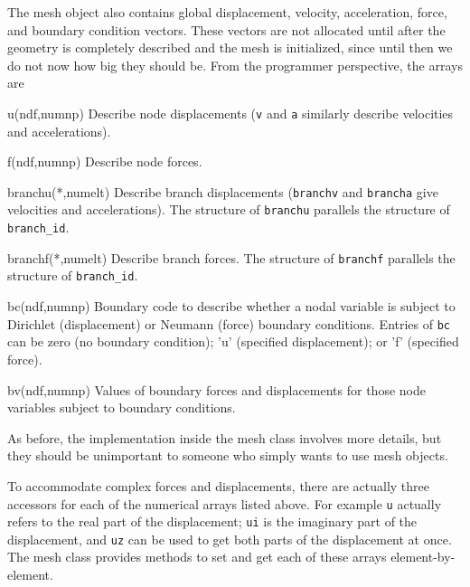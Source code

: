 \documentclass{article}
\newenvironment{codelist}[1][\quad]%
  {\begin{list}{}{%
   \settowidth{\labelwidth}{\texttt{#1}\hfil}%
   \setlength{\leftmargin}{\labelwidth}%
   \addtolength{\leftmargin}{\labelsep}%
   \addtolength{\leftmargin}{\parindent}%
   \renewcommand{\makelabel}[1]{\texttt{##1}}}}%
  {\end{list}}
\newcommand{\ttt}[1]{\texttt{#1}}
\begin{document}
The mesh object also contains global displacement, velocity,
acceleration, force, and boundary condition vectors.  These vectors
are not allocated until after the geometry is completely described and
the mesh is initialized, since until then we do not now how big they
should be.  From the programmer perspective, the arrays are
\begin{codelist}

  \item[u(ndf,numnp)]
    Describe node displacements (\ttt{v} and \ttt{a} similarly
    describe velocities and accelerations).

  \item[f(ndf,numnp)]    
    Describe node forces.

  \item[branchu(*,numelt)]
    Describe branch displacements (\ttt{branchv} and
    \ttt{brancha} give velocities and accelerations).  The
    structure of \ttt{branchu} parallels the structure of
    \ttt{branch\_id}.

  \item[branchf(*,numelt)]
    Describe branch forces.  The structure of \ttt{branchf}
    parallels the structure of \ttt{branch\_id}.

  \item[bc(ndf,numnp)]
    Boundary code to describe whether a nodal variable is subject to
    Dirichlet (displacement) or Neumann (force) boundary conditions.
    Entries of \ttt{bc} can be zero (no boundary condition); 'u'
    (specified displacement); or 'f' (specified force).

  \item[bv(ndf,numnp)]
    Values of boundary forces and displacements for those node variables
    subject to boundary conditions.

\end{codelist}
As before, the implementation inside the mesh class involves more
details, but they should be unimportant to someone who simply wants to
use mesh objects.

To accommodate complex forces and displacements, there are actually
three accessors for each of the numerical arrays listed above.  For
example \ttt{u} actually refers to the real part of the
displacement; \ttt{ui} is the imaginary part of the displacement,
and \ttt{uz} can be used to get both parts of the displacement at
once.  The mesh class provides methods to set and get each of these
arrays element-by-element.
\end{document}
